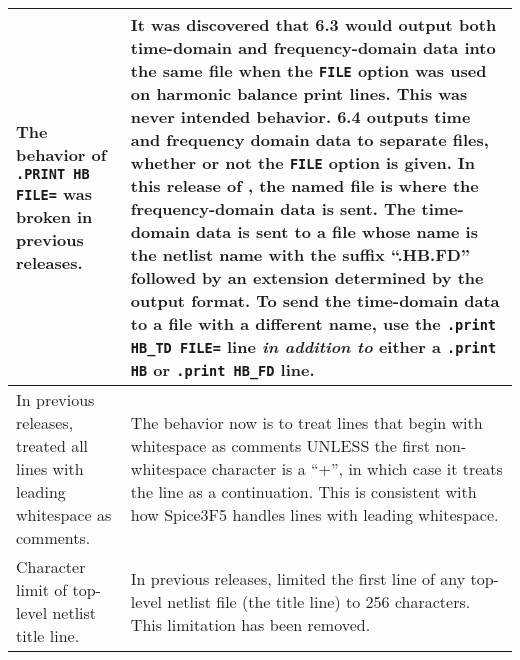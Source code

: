 {\begin{longtable}[h] {>{\raggedright\small}m{2in}|>{\raggedright\let\\\tabularnewline\small}m{3.5in}}
The behavior of \texttt{.PRINT HB FILE=} was broken in previous releases. & It
was discovered that \Xyce{} 6.3 would output both time-domain and
frequency-domain data into the same file when the \texttt{FILE} option was used
on harmonic balance print lines.  This was never intended behavior.  \Xyce{}
6.4 outputs time and frequency domain data to separate files, whether or not
the \texttt{FILE} option is given.  In this release of \Xyce{}, the named file
is where the frequency-domain data is sent.  The time-domain data is sent to a
file whose name is the netlist name with the suffix ``.HB.FD'' followed by an
extension determined by the output format.  To send the time-domain data to a
file with a different name, use the \texttt{.print HB\_TD FILE=} line {\em in
addition to\/} either a \texttt{.print HB} or \texttt{.print HB\_FD} line.
\\ \hline

In previous releases, \Xyce{} treated all lines with leading whitespace as
comments. & The \Xyce{} behavior now is to treat lines that begin with
whitespace as comments UNLESS the first non-whitespace character is a ``+'', in
which case it treats the line as a continuation.  This is consistent with how
Spice3F5 handles lines with leading whitespace.
\\ \hline

Character limit of top-level netlist title line. & In previous releases,
\Xyce{} limited the first line of any top-level netlist file (the title line)
to 256 characters.  This limitation has been removed.
\\ \hline

\end{longtable}
}
